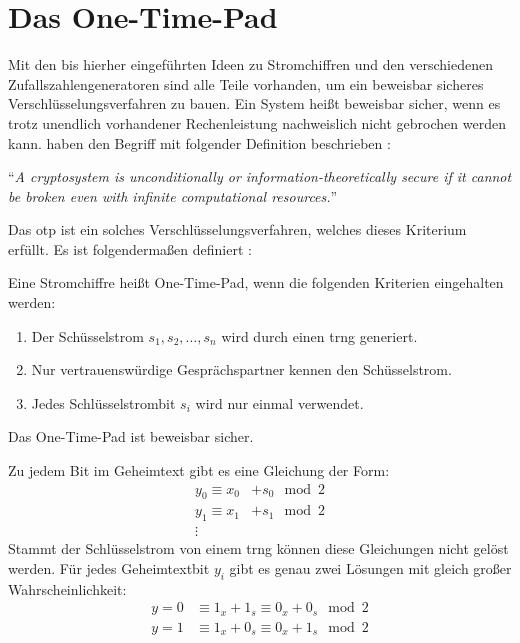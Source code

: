 \section{Das One-Time-Pad}
Mit den bis hierher eingeführten Ideen zu Stromchiffren und den verschiedenen
Zufallszahlengeneratoren sind alle Teile vorhanden, um ein beweisbar
sicheres Verschlüsselungsver\-fahren zu bauen. Ein System heißt beweisbar sicher,
wenn es trotz unendlich vorhandener Rechenleistung nachweislich nicht gebrochen werden kann.
\citeauthor{BOOK:crypto} haben den Begriff mit folgender Definition
beschrieben \parencite*[36]{BOOK:crypto}:

\begin{definition}
  \enquote{\textit{A cryptosystem is unconditionally or in\-formation-theoretically
      secure if it cannot be broken even with infinite computational resources.}}
\end{definition}

\noindent
Das \ac{otp} ist ein solches Verschlüsselungsverfahren, welches dieses Kriterium
erfüllt. Es ist folgendermaßen definiert \parencite[37]{BOOK:crypto}:

\begin{definition}
  Eine Stromchiffre heißt One-Time-Pad, wenn die folgenden Kriterien eingehalten werden:
  \begin{enumerate}[itemsep=0pt]
    \item Der Schüsselstrom $s_1,s_2,\dots,s_n$ wird durch einen \ac{trng} generiert.
    \item Nur vertrauenswürdige Gesprächspartner kennen den Schüsselstrom.
    \item Jedes Schlüsselstrombit $s_i$ wird nur einmal verwendet.
  \end{enumerate}
  Das One-Time-Pad ist beweisbar sicher.
\end{definition}
\noindent
Zu jedem Bit im Geheimtext gibt es eine Gleichung der Form:
\begin{align*}
  y_0   \equiv x_0 & + s_0 \mod{2} \\
  y_1   \equiv x_1 & + s_1 \mod{2} \\
  \vdots           &
\end{align*}
\noindent
Stammt der Schlüsselstrom von einem \ac{trng} können diese Gleichungen nicht gelöst werden.
Für jedes Geheimtextbit $y_i$ gibt es genau zwei Lösungen mit gleich großer Wahrscheinlichkeit:
\begin{align*}
  y = 0 & \equiv 1_x + 1_s \equiv 0_x + 0_s \mod{2} \\
  y = 1 & \equiv 1_x + 0_s \equiv 0_x + 1_s \mod{2}
\end{align*}

